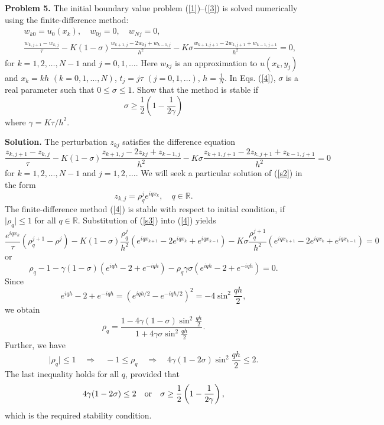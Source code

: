 \documentclass[10pt]{article}
\begin{document}

\vskip 0.5cm \noindent
{\bf Problem 5.} The initial boundary value
problem (\ref{1})--(\ref{3}) is solved numerically using the
finite-difference method:
\begin{eqnarray}
&&w_{k0}=u_{0}(x_{k}), \quad w_{0j}=0, \quad w_{Nj}=0,   \nonumber \\
&&\frac{w_{k,j+1}-w_{k,j}}{\tau}-K(1-\sigma) \frac{w_{k+1,
j}-2w_{kj}+w_{k-1,j}}{h^{2}}-K\sigma \frac{w_{k+1,
j+1}-2w_{k,j+1}+w_{k-1,j+1}}{h^{2}}=0,   \label{4}
\end{eqnarray}
for $k=1, 2, \dots , N-1$ and $j=0, 1, \dots$. Here $w_{kj}$ is an
approximation to $u(x_{k}, y_{j})$ and $x_{k}=k h$
$(k=0,1,\dots,N)$, $t_{j}=j \tau$ $(j=0,1,\dots)$, $h=\frac{1}{N}$.
In Eqs. (\ref{4}), $\sigma$ is a real parameter such that
$0\leq \sigma\leq 1$. Show that the method is stable if
\[
\sigma\geq\frac{1}{2}\left(1-\frac{1}{2\gamma}\right)
\]
where $\gamma=K\tau/h^2$.

\vskip 0.5cm \noindent
{\bf Solution.}
The perturbation  $z_{kj}$ satisfies the difference equation
\begin{equation}
\frac{z_{k,j+1}-z_{k,j}}{\tau}-K(1-\sigma) \frac{z_{k+1,
j}-2z_{kj}+z_{k-1,j}}{h^{2}}-K\sigma \frac{z_{k+1,
j+1}-2z_{k,j+1}+z_{k-1,j+1}}{h^{2}}=0 \label{s2}
\end{equation}
for $k=1,2, \dots, N-1$ and $j=1,2, \dots$. We will seek a particular solution of
(\ref{s2}) in the form
\begin{equation}
z_{k,j}=\rho_{q}^{j}e^{iqx_{k}}, \quad q\in{\mathbb R}. \label{s3}
\end{equation}
The finite-difference method (\ref{4}) is stable with respect to
initial condition, if $\vert\rho_{q}\vert\leq 1$ for all $q\in{\mathbb R}$.
Substitution of (\ref{s3}) into (\ref{4}) yields
\[
\frac{e^{iqx_{k}}}{\tau}\left(\rho_{q}^{j+1}-\rho^{j}\right)-
K(1-\sigma)\frac{\rho_{q}^{j}}{h^{2}}
\left(e^{iqx_{k+1}}-2e^{iqx_{k}}+e^{iqx_{k-1}}\right)-
K\sigma\frac{\rho_{q}^{j+1}}{h^{2}}
\left(e^{iqx_{k+1}}-2e^{iqx_{k}}+e^{iqx_{k-1}}\right)=0
\]
or
\[
\rho_{q}-1-
\gamma(1-\sigma)\left(e^{iqh}-2+e^{-iqh}\right)-
\rho_{q}\gamma\sigma\left(e^{iqh}-2+e^{-iqh}\right)=0.
\]
Since
\[
e^{iqh}-2+e^{-iqh}=\left(e^{iqh/2}-e^{-iqh/2}\right)^{2}=-4\sin^{2} \frac{qh}{2},
\]
we obtain
\[
\rho_{q}=\frac{1-4\gamma(1-\sigma)\sin^{2} \frac{qh}{2}}
{1+4\gamma\sigma\sin^{2} \frac{qh}{2}}.
\]
Further, we have
\[
\vert\rho_{q}\vert\leq 1 \quad \Rightarrow \quad -1\leq\rho_{q}
\quad \Rightarrow \quad 4\gamma(1-2\sigma)\sin^{2} \frac{qh}{2}\leq 2.
\]
The last inequality holds for all $q$, provided that
\[
4\gamma(1-2\sigma)\leq 2
\quad {\rm or} \quad \sigma\geq\frac{1}{2}\left(1-\frac{1}{2\gamma}\right),
\]
which is the required stability  condition.
\end{document}
